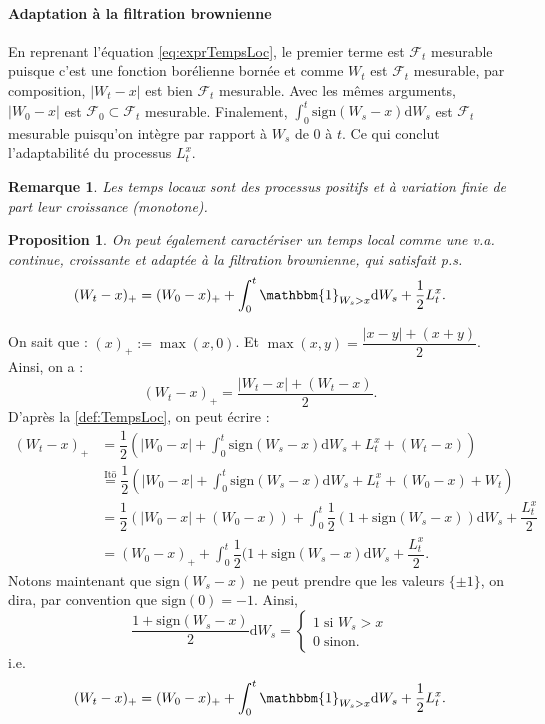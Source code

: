 \documentclass[openany]{book}
\makeatletter
\newcommand{\F}{\mathscr{F}}
\newcommand{\1}{\mathbbm{1}}
\newcommand{\sign}{\text{sign}}
\renewcommand{\d}{\mathrm{d}}
\renewenvironment{proof}[1][\textbf{\textit{Démonstration}}]{%
  \par\pushQED{\qed}%
  \normalfont\topsep6\p@\@plus6\p@\relax
  \trivlist\item[\hskip\labelsep
    #1\@addpunct{.}]\ignorespaces
}{%
  \popQED\endtrivlist\@endpefalse
}
\theoremstyle{thmfont}
\theoremstyle{deffont}
\theoremstyle{thmfont}
\newtheorem{prop}[prop]{Proposition}
\theoremstyle{deffont}
\newtheorem{remark}[remark]{Remarque}
\makeatother
\begin{document}
\begin{proof}
\paragraph{Adaptation à la filtration brownienne}
En reprenant l'équation \eqref{eq:exprTempsLoc}, le premier terme est $\F_t$ mesurable puisque c'est une fonction borélienne bornée et comme $W_t$ est $\F_t$ mesurable, par composition, $|W_t -x|$ est bien $\F_t$ mesurable. Avec les mêmes arguments, $|W_0 -x|$ est $\F_0 \subset \F_t$ mesurable. Finalement, $\int_0^t\sign(W_s -x)\d W_s$ est $\F_t$ mesurable puisqu'on intègre par rapport à $W_s$ de $0$ à $t$. Ce qui conclut l'adaptabilité du processus $L_t^x$.
\end{proof}


\begin{remark}
Les temps locaux sont des processus \textit{positifs} et à \textit{variation finie} de part leur croissance (monotone).
\end{remark}

\begin{prop}
  \label{prop:Tanaka2}
  On peut également caractériser un \textit{temps local} comme une v.a. continue, croissante et adaptée à la filtration brownienne, qui satisfait p.s.
  \begin{equation}
    (W_t - x)_+ = (W_0 - x)_+ + \int_0^t \1_{W_s > x}\d W_s + \dfrac{1}{2}L_t^x.
  \end{equation}
\end{prop}

\begin{proof}
  On sait que : $(x)_+ := \max(x, 0)$. Et $\max(x,y) = \dfrac{|x-y| + (x+y)}{2}$.
  Ainsi, on a : $$(W_t - x)_+ = \dfrac{|W_t - x| + (W_t - x)}{2}.$$
  D'après la \autoref{def:TempsLoc}, on peut écrire :
  \begin{align*}
    (W_t - x)_+ &= \dfrac{1}{2}\left(|W_0 - x| + \int_0^t\sign(W_s - x)\d W_s + L_t^x + (W_t - x)\right)\\
    &\overset{\text{Itō}}{=} \dfrac{1}{2} \left(|W_0 - x| + \int_0^t\sign(W_s - x)\d W_s + L_t^x + (W_0 - x) + W_t \right)\\
    &= \dfrac{1}{2} \left(|W_0 - x| + (W_0 - x) \right) + \int_0^t\dfrac{1}{2}(1 + \sign(W_s - x))\d W_s + \dfrac{L_t^x}{2}\\
    &= (W_0 - x)_+ + \int_0^t\dfrac{1}{2}(1 + \sign(W_s - x) \d W_s + \dfrac{L_t^x}{2}.
  \end{align*}
  Notons maintenant que $\sign(W_s - x)$ ne peut prendre que les valeurs $\{\pm 1\}$, on dira, par convention que $\sign(0) = -1$. Ainsi,
  $$ \dfrac{1 + \sign(W_s - x)}{2}\d W_s =
  \begin{cases} 1\; \text{si } W_s > x\\
                0 \; \text{sinon.}
  \end{cases}
  $$
 i.e.
 $$(W_t - x)_+ = (W_0 - x)_+ + \int_0^t\1_{W_s > x} \d W_s + \frac{1}{2}L_t^x.$$
  
\end{proof}
\end{document}
